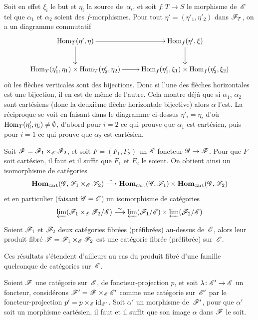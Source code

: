 Soit en effet $\xi_i$ le but et $\eta_i$ la source de~$\alpha_i$, et
soit $f\colon T\to S$ le morphisme de~$\cal{E}$ tel que $\alpha_1$ et
$\alpha_2$ soient des $f$-morphismes. Pour tout
$\eta'=(\eta'_1,\eta'_2)$ dans $\cal{F}_T$, on a un diagramme
commutatif
$$
\xymatrix{{\mathrm{Hom}_T(\eta',\eta)}\ar[r]\ar[d]&{\mathrm{Hom}_f(\eta',\xi)}\ar[d]\\{\mathrm{Hom}_T(\eta'_1,\eta_1)\times\mathrm{Hom}_T(\eta'_2,\eta_2)}\ar[r]&{\mathrm{Hom}_f(\eta'_1,\xi_1)\times \mathrm{Hom}_f(\eta'_2,\xi_2)}}
$$
o\`u les fl\`eches verticales sont des bijections. Donc si l'une
des fl\`eches horizontales est une bijection, il en est de m\^eme
de l'autre. Cela montre d\'ej\`a que si $\alpha_1$, $\alpha_2$
sont cart\'esiens (donc la deuxi\`eme fl\`eche horizontale
bijective) alors $\alpha$ l'est. La r\'eciproque se voit en faisant
dans le diagramme ci-dessus $\eta'_i=\eta_i$ d'o\`u
$\operatorname{Hom}_T(\eta'_i,\eta_i) \neq \emptyset$, d'abord pour $i=2$ ce qui
prouve que $\alpha_1$ est cart\'esien, puis pour $i=1$ ce qui prouve
que $\alpha_2$ est cart\'esien.

\begin{corollaire}
\label{VI.6.4}
Soit
$\cal{F} = \cal{F}_1\times_{\cal{E}}\cal{F}_2$, et soit
$F=(F_1,F_2)$ un $\cal{E}$-foncteur $\cal{G}\to\cal{F}$. Pour que
$F$
soit cart\'esien, il faut et il suffit que $F_1$ et $F_2$ le
soient. On obtient ainsi un isomorphisme de cat\'egories
$$
\SheafHom_\cart(\cal{G}, \cal{F}_1 \times_{\cal{E}} \cal{F}_2) \isomto
\SheafHom_\cart(\cal{G},\cal{F}_1)
\times\SheafHom_\cart(\cal{G},\cal{F}_2)
$$
et en particulier (faisant $\cal{G}=\cal{E}$) un isomorphisme de
cat\'egories
$$
\varprojLim(\cal{F}_1 \times_{\cal{E}}
\cal{F}_2/\cal{E}) \isomto
\varprojLim(\cal{F}_1/\cal{E}) \times
\varprojLim(\cal{F}_2/\cal{E})
$$
\end{corollaire}

\begin{corollaire}
\label{VI.6.5}
Soient $\cal{F}_1$ et $\cal{F}_2$ deux cat\'egories fibr\'ees
(\resp pr\'efibr\'ees) au-dessus de~$\cal{E}$, alors leur produit
fibr\'e $\cal{F}=\cal{F}_1 \times_{\cal{E}}\cal{F}_2$ est une
cat\'egorie fibr\'ee (\resp pr\'efibr\'ee) sur~$\cal{E}$.
\end{corollaire}

Ces r\'esultats s'\'etendent d'ailleurs au cas du produit
fibr\'e d'une famille quelconque de cat\'egories sur~$\cal{E}$.

\begin{proposition}
\label{VI.6.6}
Soient $\cal{F}$ une cat\'egorie sur~$\cal{E}$, de
foncteur-projection $p$, et soit $\lambda \colon \cal{E}' \to \cal{E}$
un foncteur, consid\'erons
$\cal{F}'=\cal{F}\times_{\cal{E}}\cal{E}'$ comme une cat\'egorie sur~$\cal{E}'$ par le foncteur-projection $p'=p \times_{\cal{E}}
\id_{\cal{E}'}$. Soit $\alpha'$ un morphisme de~$\cal{F}'$, pour que
$\alpha'$ soit un morphisme cart\'esien, il faut et il suffit que
son image $\alpha$ dans $\cal{F}$ le soit.
\end{proposition}


